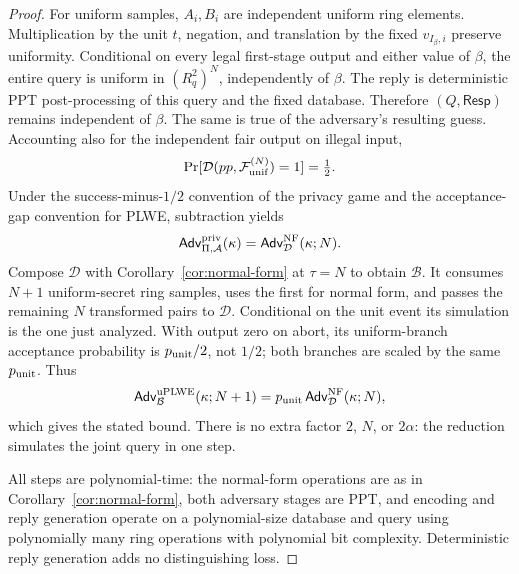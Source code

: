 \begin{proof}
For uniform samples, \(A_i,B_i\) are independent uniform ring elements.
Multiplication by the unit \(t\), negation, and translation by the fixed
\(v_{I_\beta,i}\) preserve uniformity. Conditional on every legal first-stage
output and either value of \(\beta\), the entire query is uniform in
\((R_q^2)^N\), independently of \(\beta\). The reply is deterministic PPT
post-processing of this query and the fixed database. Therefore
\((Q,\mathsf{Resp})\) remains independent of \(\beta\).
The same is true of the adversary's resulting guess. Accounting also
for the independent fair output on illegal input,
\[
 \Pr[\mathcal D(pp,\mathcal F_{\rm unif}^{(N)})=1]=\tfrac12.
\]
Under the success-minus-\(1/2\) convention of the privacy game and the
acceptance-gap convention for PLWE, subtraction yields
\[
 \mathsf{Adv}^{\rm priv}_{\Pi,\mathcal A}(\kappa)
 =\mathsf{Adv}^{\rm NF}_{\mathcal D}(\kappa;N).
\]
Compose \(\mathcal D\) with Corollary~\ref{cor:normal-form} at \(\tau=N\)
to obtain \(\mathcal B\). It consumes \(N+1\) uniform-secret ring samples,
uses the first for normal form, and passes the remaining \(N\) transformed
pairs to \(\mathcal D\). Conditional on the unit event its simulation is
the one just analyzed. With output zero on abort, its uniform-branch
acceptance probability is \(p_{\rm unit}/2\), not \(1/2\); both branches
are scaled by the same \(p_{\rm unit}\). Thus
\[
 \mathsf{Adv}^{\rm uPLWE}_{\mathcal B}(\kappa;N+1)
 =p_{\rm unit}\,\mathsf{Adv}^{\rm NF}_{\mathcal D}(\kappa;N),
\]
which gives the stated bound. There is no extra factor \(2\), \(N\), or
\(2\alpha\): the reduction simulates the joint query in one step.

All steps are polynomial-time: the normal-form operations are as in
Corollary~\ref{cor:normal-form}, both adversary stages are PPT, and
encoding and reply generation operate on a polynomial-size database
and query using polynomially many ring operations with polynomial
bit complexity. Deterministic reply generation adds no distinguishing loss.
\end{proof}
